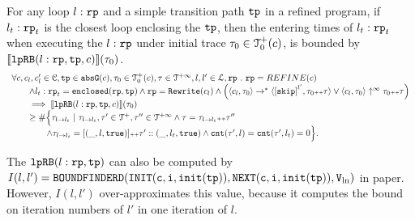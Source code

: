 \begin{lem}
  \label{lem:looprb-sound}
  For any loop $l: \mathtt{rp}$ and a simple transition path $\mathtt{tp}$ in a refined program, if $l_t: \mathtt{rp}_t$ is the closest loop enclosing the $\mathtt{tp}$, then the entering times of $l_t: \mathtt{rp}_t$ when executing the $l: \mathtt{rp}$ under initial trace $\mathtt{\tau}_0 \in \mathcal{T}^{+}_0(c)$, is bounded by $\llbracket \mathtt{lpRB}(l: \mathtt{rp}, \mathtt{tp}, c) \rrbracket(\mathtt{\tau}_0)$.
  \[
    \begin{array}{l}
    \forall c, c_l, c_l' \in \cdom, \tpath \in \absG(c), \trace_0 \in \ftdom_0(c), \trace \in \tdom, l, l' \in \ldom, \rprog \st 
    \rprog = REFINE(c)
    \\ \qquad
    \land l_t: \rprog_t = \kw{enclosed}(\rprog, \tpath)
    \land 
    \rprog = \algrewrite(c_l)
    \land
    \Big(
    \config{c_l, \trace_0} \to^* \config{\clabel{\eskip}^{l'}, \trace_0 \tracecat \trace}
    \lor \config{c_l, \trace_0} \uparrow^{\infty} \trace_0 \tracecat \trace 
    \Big)
    \\ \qquad
    \implies
    \econfig{\lpchB(l: \rprog, \tpath, c)}(\trace_0) 
    \\ \qquad \geq 
    \# \Big\{\trace_{l \to l_t} ~\vert~ \trace_{l \to l_t}, \trace' \in \ftdom, \trace'' \in \tdom
    \land \trace = \trace_{l \to l_t} \tracecat \trace''
    \\ \qquad \qquad
    \land \trace_{l \to l_t} = [(\_, l, \etrue)] \tracecat \trace' :: (\_, l_t, \etrue)
    \land \counter(\trace', l) = \counter(\trace', l_t) = 0 
    \Big\}.
    \end{array}
  \]
\end{lem}
%
The $\mathtt{lpRB}(l:\mathtt{rp}, \mathtt{tp})$ 
can also be computed by
$I(l, l') = \mathtt{BOUNDFINDERD(INIT(c, i, \mathtt{init}(\mathtt{tp})), NEXT(c, i, \mathtt{init}(\mathtt{tp})), V_{\ln})}$ in paper\cite{GulwaniJK09}.
However, $I(l, l')$ over-approximates this value, because it computes the bound on iteration numbers of $l'$ in one iteration of $l$.
